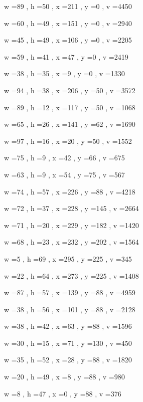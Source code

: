 \documentclass[11pt]{article}
\begin{document}
w =89 , h =50 , x =211 , y =0 , v =4450
\par
w =60 , h =49 , x =151 , y =0 , v =2940
\par
w =45 , h =49 , x =106 , y =0 , v =2205
\par
w =59 , h =41 , x =47 , y =0 , v =2419
\par
w =38 , h =35 , x =9 , y =0 , v =1330
\par
w =94 , h =38 , x =206 , y =50 , v =3572
\par
w =89 , h =12 , x =117 , y =50 , v =1068
\par
w =65 , h =26 , x =141 , y =62 , v =1690
\par
w =97 , h =16 , x =20 , y =50 , v =1552
\par
w =75 , h =9 , x =42 , y =66 , v =675
\par
w =63 , h =9 , x =54 , y =75 , v =567
\par
w =74 , h =57 , x =226 , y =88 , v =4218
\par
w =72 , h =37 , x =228 , y =145 , v =2664
\par
w =71 , h =20 , x =229 , y =182 , v =1420
\par
w =68 , h =23 , x =232 , y =202 , v =1564
\par
w =5 , h =69 , x =295 , y =225 , v =345
\par
w =22 , h =64 , x =273 , y =225 , v =1408
\par
w =87 , h =57 , x =139 , y =88 , v =4959
\par
w =38 , h =56 , x =101 , y =88 , v =2128
\par
w =38 , h =42 , x =63 , y =88 , v =1596
\par
w =30 , h =15 , x =71 , y =130 , v =450
\par
w =35 , h =52 , x =28 , y =88 , v =1820
\par
w =20 , h =49 , x =8 , y =88 , v =980
\par
w =8 , h =47 , x =0 , y =88 , v =376
\par
\newpage
\end{document}
